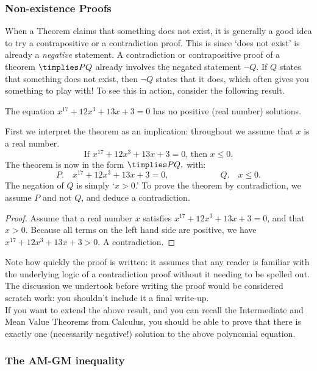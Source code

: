 \subsubsection*{Non-existence Proofs}

When a Theorem claims that something does not exist, it is generally a good idea to try a contrapositive or a contradiction proof. This is since `does not exist' is already a \emph{negative} statement. A contradiction or contrapositive proof of a theorem $\timplies PQ$ already involves the negated statement $\neg Q$. If $Q$ states that something does not exist, then $\neg Q$ states that it does, which often gives you something to play with! To see this in action, consider the following result.

\begin{thm}
The equation $x^{17}+12x^3+13x+3=0$ has no positive (real number) solutions.
\end{thm}

\noindent First we interpret the theorem as an implication: throughout we assume that $x$ is a real number.
\[\text{If $x^{17}+12x^3+13x+3=0$, then $x\leq 0$.}\]
The theorem is now in the form $\timplies P{Q,}$ with:
\[P.\quad x^{17}+12x^3+13x+3=0,\qquad\qquad\qquad Q.\quad x\le 0.\]
The negation of $Q$ is simply `$x>0$.' To prove the theorem by contradiction, we assume $P$ and not $Q$, and deduce a contradiction.

\begin{proof}
Assume that a real number $x$ satisfies $x^{17}+12x^3+13x+3=0$, and that $x>0$. Because all terms on the left hand side are positive, we have $x^{17}+12x^3+13x+3>0$. A contradiction.
\end{proof}


\noindent Note how quickly the proof is written: it assumes that any reader is familiar with the underlying logic of a contradiction proof without it needing to be spelled out. The discussion we undertook before writing the proof would be considered scratch work: you shouldn't include it a final write-up.\\

\noindent If you want to extend the above result, and you can recall the Intermediate and Mean Value Theorems from Calculus, you should be able to prove that there is exactly one (necessarily negative!) solution to the above polynomial equation.

\subsubsection*{The AM-GM inequality}

